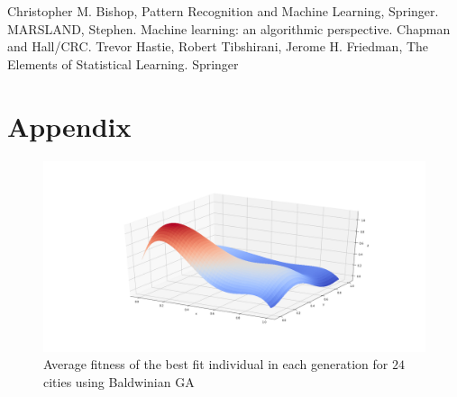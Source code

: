 \documentclass [11pt]{article}
\begin{document}
\newpage
\begin{thebibliography}{111}
\raggedright
{} Christopher M. Bishop, Pattern Recognition and Machine Learning, Springer.
 MARSLAND, Stephen. Machine learning: an algorithmic perspective. Chapman and Hall/CRC.
 Trevor Hastie, Robert Tibshirani, Jerome H. Friedman, The Elements of Statistical Learning. Springer
\end{thebibliography}

\newpage
\appendix
\section{Appendix}
\begin{figure}[H]
\centering
\includegraphics[width=1\textwidth]{figures/RidgeFranke.png}
        \caption{Average fitness of the best fit individual in each generation for $24$ cities using Baldwinian GA}
        \label{fig:RidgeFranke}
\end{figure}
\end{document}
